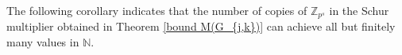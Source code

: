 \documentclass[preprint,sort&compress,12pt]{elsarticle}
\numberwithin{equation}{section}
\theoremstyle{definition}
\newcommand{\Z}{\mathbb{Z}}
\begin{document}


The following corollary indicates that the number of copies of $\mathbb{Z}_{p^s}$ in the Schur multiplier obtained in Theorem \ref{bound M(G_{j,k})} can achieve all but finitely many values in $\mathbb{N}$.
\end{document}
